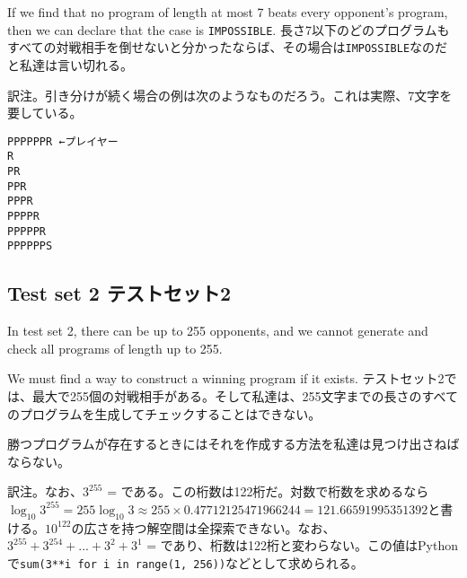 \documentclass[uplatex,dvipdfmx]{jsarticle} \usepackage{amsmath,amssymb,bm}
\begin{document}
\vspace{\baselineskip}
\begin{paracol}{2}
If we find that no program of length at most 7 beats every opponent's program, then we can declare that the case is {\tt IMPOSSIBLE}.
\switchcolumn
長さ7以下のどのプログラムもすべての対戦相手を倒せないと分かったならば、その場合は{\tt IMPOSSIBLE}なのだと私達は言い切れる。
\end{paracol}
\vspace{\baselineskip}
訳注。引き分けが続く場合の例は次のようなものだろう。これは実際、7文字を要している。
\begin{verbatim}
PPPPPPR ←プレイヤー
R
PR
PPR
PPPR
PPPPR
PPPPPR
PPPPPPS
\end{verbatim}
\subsection*{Test set 2 テストセット2}
\begin{paracol}{2}
In test set 2, there can be up to 255 opponents, and we cannot generate and check all programs of length up to 255.

We must find a way to construct a winning program if it exists.
\switchcolumn
テストセット2では、最大で255個の対戦相手がある。そして私達は、255文字までの長さのすべてのプログラムを生成してチェックすることはできない。

勝つプログラムが存在するときにはそれを作成する方法を私達は見つけ出さねばならない。
\end{paracol}
\vspace{\baselineskip}
訳注。なお、$3^{255}$ = である。この桁数は122桁だ。対数で桁数を求めるなら$\log_{10}{3^{255}}=255\log_{10}3\approx255\times 0.47712125471966244 = 121.66591995351392$と書ける。$10^{122}$の広さを持つ解空間は全探索できない。なお、$3^{255}+3^{254}+...+3^2+3^1$ = であり、桁数は122桁と変わらない。この値はPythonで{\tt sum(3**i for i in range(1, 256))}などとして求められる。
\vspace{\baselineskip}
\end{document}

